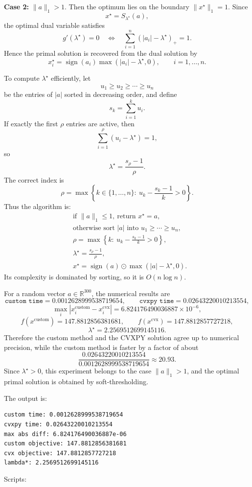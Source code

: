 \documentclass[11pt,letter,notitlepage]{article}
\theoremstyle{definition}
\begin{document}
\begin{solution}
\textbf{Case 2:} $\|a\|_1>1$.
Then the optimum lies on the boundary $\|x^\star\|_1=1$. Since
\[
x^\star=S_{\lambda^\star}(a),
\]
the optimal dual variable satisfies
\[
g'(\lambda^\star)=0
\quad\Longleftrightarrow\quad
\sum_{i=1}^n (|a_i|-\lambda^\star)_+=1.
\]
Hence the primal solution is recovered from the dual solution by
\[
x_i^\star
=
\operatorname{sign}(a_i)\max(|a_i|-\lambda^\star,0),
\qquad i=1,\dots,n.
\]

To compute $\lambda^\star$ efficiently, let
\[
u_1\ge u_2\ge \cdots \ge u_n
\]
be the entries of $|a|$ sorted in decreasing order, and define
\[
s_k=\sum_{i=1}^k u_i.
\]
If exactly the first $\rho$ entries are active, then
\[
\sum_{i=1}^{\rho}(u_i-\lambda^\star)=1,
\]
so
\[
\lambda^\star=\frac{s_\rho-1}{\rho}.
\]
The correct index is
\[
\rho
=
\max\left\{k\in\{1,\dots,n\}:\ u_k-\frac{s_k-1}{k}>0\right\}.
\]
Thus the algorithm is:
\[
\boxed{
\begin{aligned}
&\text{if }\|a\|_1\le 1,\ \text{return }x^\star=a,\\
&\text{otherwise sort }|a| \text{ into }u_1\ge\cdots\ge u_n,\\
&\rho=\max\left\{k:\ u_k-\frac{s_k-1}{k}>0\right\},\\
&\lambda^\star=\frac{s_\rho-1}{\rho},\\
&x^\star=\operatorname{sign}(a)\odot\max(|a|-\lambda^\star,0).
\end{aligned}}
\]
Its complexity is dominated by sorting, so it is $O(n\log n)$.

For a random vector $a\in\mathbb{R}^{300}$, the numerical results are
\[
\texttt{custom time}=0.0012628999538719654,
\qquad
\texttt{cvxpy time}=0.02643220010213554,
\]
\[
\max_i|x_i^{\text{custom}}-x_i^{\text{cvx}}|
=6.824176490036887\times 10^{-6},
\]
\[
f(x^{\text{custom}})=147.8812856381681,
\qquad
f(x^{\text{cvx}})=147.8812857727218,
\]
\[
\lambda^\star=2.2569512699145116.
\]
Therefore the custom method and the CVXPY solution agree up to numerical precision, while the custom method is faster by a factor of about
\[
\frac{0.02643220010213554}{0.0012628999538719654}\approx 20.93.
\]
Since $\lambda^\star>0$, this experiment belongs to the case $\|a\|_1>1$, and the optimal primal solution is obtained by soft-thresholding.

The output is:
\begin{lstlisting}
custom time: 0.0012628999538719654
cvxpy time: 0.02643220010213554
max abs diff: 6.824176490036887e-06
custom objective: 147.8812856381681
cvx objective: 147.8812857727218
lambda*: 2.2569512699145116
\end{lstlisting}

Scripts:


\end{solution}
	
\end{document}
